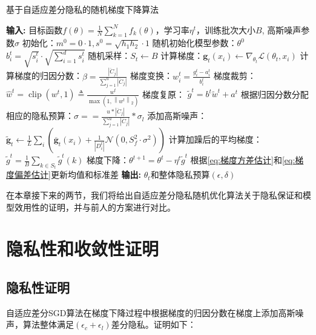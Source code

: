 \begin{algorithm}[!htb]
	\caption{基于自适应差分隐私的随机梯度下降算法}
	\label{基于自适应差分隐私的随机梯度下降算法}
	\begin{algorithmic}[1]
		\footnotesize
		\STATE \textbf{输入:} 目标函数$f(\theta)=\frac{1}{N} \sum_{k=1}^{N} f_{k}(\theta)$，学习率$\eta^{t}$，训练批次大小$B$, 高斯噪声参数$\sigma$ 
		\STATE 初始化：$m^{0}=0 \cdot 1, s^{0}=\sqrt{h_{1} h_{2}} \cdot 1$
		\STATE 随机初始化模型参数：$\theta^{0}$
				\STATE $b_{i}^{t}=\sqrt{s_{i}^{t}} \cdot \sqrt{\sum_{i=1}^{d} s_{i}^{t}}$
			\ENDFOR
			\STATE 随机采样：$S_{t} \leftarrow B$
				\STATE 计算梯度：$\mathbf{g}_{t}\left(x_{i}\right) \leftarrow \nabla_{\theta_{t}} \mathcal{L}\left(\theta_{t}, x_{i}\right)$
				\STATE 计算梯度的归因分数：$\beta=\frac{\left|\ddot{C}_{j}\right|}{\sum_{j=1}^{u}\left|\ddot{C}_{j}\right|}$
				\STATE 梯度变换：$w_{i}^{t}=\frac{g_{i}^{t}-a_{i}^{t}}{b_{i}^{t}}$
				\STATE 梯度裁剪： $\hat{w}^{t}=\operatorname{clip}\left(w^{t}, 1\right) \triangleq \frac{w^{t}}{\max \left(1,\left\|w^{t}\right\|_{2}\right)}$
				\STATE 梯度复原： $\tilde{g}^{t}=b^{t} \tilde{w}^{t}+a^{t}$
				\STATE 根据归因分数分配相应的隐私预算：$\sigma==\frac{u *\left|\ddot{C}_{j}\right|}{\sum_{j=1}^{u}\left|\ddot{C}_{j}\right|} * \sigma_{l}$
				\STATE 添加高斯噪声：$\tilde{\mathbf{g}}_{t} \leftarrow \frac{1}{L} \sum_{i}\left(\overline{\mathbf{g}}_{t}\left(x_{i}\right)+\frac{1}{\left|D_{i}^{t}\right|}\mathcal{N}\left(0, S_{f}^{2} \cdot \sigma^{2}\right)\right)$
			\ENDFOR
			\STATE 计算加躁后的平均梯度：$\tilde{g}^{t}=\frac{1}{B} \sum_{k \in S_{t}} \tilde{g}^{t}(k)$
			\STATE 梯度下降：$\theta^{t+1}=\theta^{t}-\eta^{t} \tilde{g}^{t}$
			\STATE 根据\ref{eq:梯度方差估计}和\ref{eq:梯度偏差估计}更新均值和标准差
		\ENDFOR
		\STATE \textbf{输出:} $\theta_{t}$和整体隐私预算$(\epsilon, \delta)$
	\end{algorithmic}
\end{algorithm}

在本章接下来的两节，我们将给出自适应差分隐私随机优化算法关于隐私保证和模型效用性的证明，并与前人的方案进行对比。

\section{隐私性和收敛性证明}

\subsection{隐私性证明}
自适应差分SGD算法在梯度下降过程中根据梯度的归因分数在梯度上添加高斯噪声，算法整体满足$\left(\epsilon_{c}+\epsilon_{l}\right)$差分隐私。证明如下：

